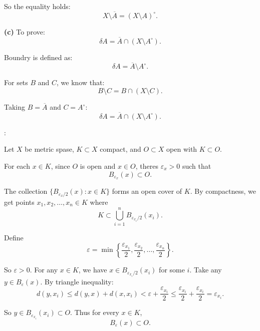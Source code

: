 \documentclass[12pt,oneside]{article}
\theoremstyle{definition}
\begin{document}
\begin{solution}
So the equality holds:
\[
X\setminus \overline{A} = (X\setminus A)^\circ.
\]

\textbf{(c)} To prove:
\[
\delta A = \overline{A} \cap (X\setminus A^\circ).
\]

Boundry is defined as:
\[
\delta A = \overline{A}\setminus A^\circ.
\]

For sets \(B\) and \(C\), we know that:
\[
B\setminus C = B\cap (X\setminus C).
\]

Taking \(B=\overline{A}\) and \(C=A^\circ\):
\[
\delta A = \overline{A}\cap (X\setminus A^\circ).
\]
\end{solution}

\newpage











\begin{solution}
:

Let \(X\) be metric spase, \(K\subset X\) compact, and \(O\subset X\) open with \(K\subset O\). 

For each \(x\in K\), since \(O\) is open and \(x\in O\), theres \(\varepsilon_x>0\) such that 
\[
B_{\varepsilon_x}(x)\subset O.
\]

The collection \(\{B_{\varepsilon_x/2}(x): x\in K\}\) forms an open cover of \(K\). By compactness, we get points \(x_1, x_2, \dots, x_n\in K\) where
\[
K\subset \bigcup_{i=1}^n B_{\varepsilon_{x_i}/2}(x_i).
\]

Define
\[
\varepsilon = \min\left\{\frac{\varepsilon_{x_1}}{2},\frac{\varepsilon_{x_2}}{2},\dots,\frac{\varepsilon_{x_n}}{2}\right\}.
\]

So \(\varepsilon > 0\). For any \(x\in K\), we have \(x\in B_{\varepsilon_{x_i}/2}(x_i)\) for some \(i\). Take any \(y\in B_\varepsilon(x)\). By triangle inequality:
\[
d(y,x_i) \le d(y,x) + d(x,x_i) < \varepsilon + \frac{\varepsilon_{x_i}}{2} \le \frac{\varepsilon_{x_i}}{2} + \frac{\varepsilon_{x_i}}{2} = \varepsilon_{x_i}.
\]

So \(y\in B_{\varepsilon_{x_i}}(x_i)\subset O\). Thus for every \(x\in K\),
\[
B_\varepsilon(x) \subset O.
\]
\end{solution}

\newpage
\end{document}
